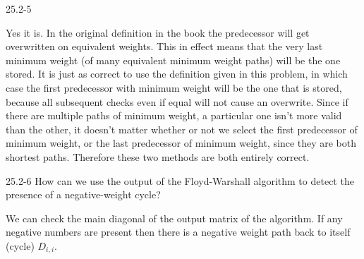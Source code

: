 \begin{problem}{25.2-5}
  \begin{solution}
    Yes it is. In the original definition in the book the predecessor will get overwritten on equivalent weights.
    This in effect means that the very last minimum weight (of many equivalent minimum weight paths) will be the one stored.
    It is just as correct to use the definition given in this problem, in which case the first predecessor with minimum
    weight will be the one that is stored, because all subsequent checks even if equal will not cause an overwrite.
    \br
    Since if there are multiple paths of minimum weight, a particular one isn't more valid than the other, it doesn't
    matter whether or not we select the first predecessor of minimum weight, or the last predecessor of minimum weight,
    since they are both shortest paths.
    \br
    Therefore these two methods are both entirely correct.
  \end{solution}
\end{problem}

\begin{problem}{25.2-6}
  How can we use the output of the Floyd-Warshall algorithm to detect the presence of a negative-weight cycle?
  \begin{solution}
    We can check the main diagonal of the output matrix of the algorithm.  If any negative numbers are present then
    there is a negative weight path back to itself (cycle) $D_{i,i}$.
  \end{solution}
\end{problem}


